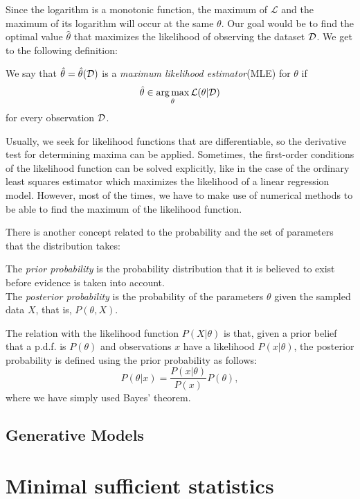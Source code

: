 Since the logarithm is a monotonic function, the maximum of $\mathcal L$ and the maximum of its logarithm will occur at the same $\theta$.   Our goal would be to find the optimal value $\hat{\theta}$ that maximizes the likelihood of observing the dataset $\mathcal{D}$. We get to the following definition:

\begin{ndef}
    We say that $\hat{\theta} = \hat\theta (\mathcal{D})$ is a \emph{maximum likelihood estimator}(MLE) for $\theta$ if  
    $$
    \hat\theta \in \operatorname*{arg\,max}_{\theta} \mathcal L(\theta | \mathcal{D})
    $$
    for every observation $\mathcal{D}$. 
\end{ndef}

Usually, we seek for likelihood functions that are differentiable, so the derivative test for determining maxima can be applied. Sometimes, the first-order conditions of the likelihood function can be solved explicitly, like in the case of the ordinary least squares estimator which maximizes the likelihood of a linear regression model. However, most of the times, we have to make use of numerical methods to be able to find the maximum of the likelihood function.

There is another concept related to the probability and the set of parameters that the distribution takes:
\begin{ndef}
The \emph{prior probability} is the probability distribution that it is believed to exist before evidence is taken into account.\\

The \emph{posterior probability} is the probability of the parameters $\theta$ given the sampled data $X$, that is, $P(\theta,X)$.
\end{ndef}
The relation with the likelihood function $P(X|\theta)$ is that, given a prior belief that a p.d.f. is $P(\theta)$ and observations $x$ have a likelihood $P(x|\theta)$, the posterior probability is defined using the prior probability as follows:
\[
P(\theta|x) = \frac{P(x|\theta)}{P(x)} P(\theta),   
\]
where we have simply used Bayes' theorem.


\subsection{Generative Models}


\section{Minimal sufficient statistics}

